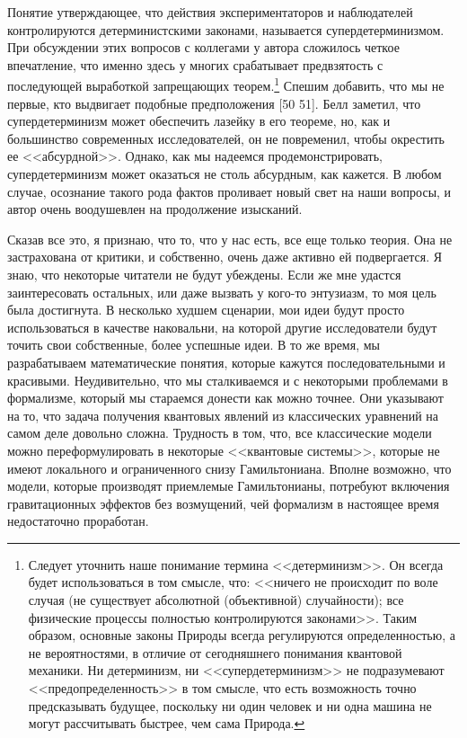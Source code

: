 \documentclass[main.tex]{subfiles}
\begin{document}
Понятие утверждающее, что действия экспериментаторов и наблюдателей контролируются детерминистскими законами, называется супердетерминизмом. При обсуждении этих вопросов с коллегами у автора сложилось четкое впечатление, что именно здесь у многих срабатывает предвзятость с последующей выработкой запрещающих теорем.\footnote{Следует уточнить наше понимание термина <<детерминизм>>. Он всегда будет использоваться в том смысле, что: <<ничего не происходит по воле случая (не существует абсолютной (объективной) случайности); все физические процессы полностью контролируются законами>>. Таким образом, основные законы Природы всегда регулируются определенностью, а не вероятностями, в отличие от сегодняшнего понимания квантовой механики. Ни детерминизм, ни <<супердетерминизм>> не подразумевают <<предопределенность>> в том смысле, что есть возможность точно предсказывать будущее, поскольку ни один человек и ни одна машина не могут рассчитывать быстрее, чем сама Природа.} Спешим добавить, что мы не первые, кто выдвигает подобные предположения [50 51]. Белл заметил, что супердетерминизм может обеспечить лазейку в его теореме, но, как и большинство современных исследователей, он не повременил, чтобы окрестить ее <<абсурдной>>. Однако, как мы надеемся продемонстрировать, супердетерминизм может оказаться не столь абсурдным, как кажется. В любом случае, осознание такого рода фактов проливает новый свет на наши вопросы, и автор очень воодушевлен на продолжение изысканий. 

Сказав все это, я признаю, что то, что у нас есть, все еще только теория. Она не застрахована от критики, и собственно, очень даже активно ей подвергается. Я знаю, что некоторые читатели не будут убеждены. Если же мне удастся заинтересовать остальных, или даже вызвать у кого-то энтузиазм, то моя цель была достигнута. В несколько худшем сценарии, мои идеи будут просто использоваться в качестве наковальни, на которой другие исследователи будут точить свои собственные, более успешные идеи. В то же время, мы разрабатываем математические понятия, которые кажутся последовательными и красивыми. Неудивительно, что мы сталкиваемся и с некоторыми проблемами в формализме, который мы стараемся донести как можно точнее. Они указывают на то, что задача получения квантовых явлений из классических уравнений на самом деле довольно сложна. Трудность в том, что, все классические модели можно переформулировать в некоторые <<квантовые системы>>, которые не имеют локального и ограниченного снизу Гамильтониана. Вполне возможно, что модели, которые производят приемлемые Гамильтонианы, потребуют включения гравитационных эффектов без возмущений, чей формализм в настоящее время недостаточно проработан.
\end{document}
